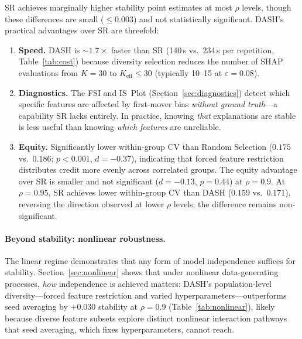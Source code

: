 \documentclass[11pt]{article}
\newcommand{\dash}{\textsc{DASH}}
\newcommand{\rhovar}{\rho}
\begin{document}
SR achieves marginally higher stability point estimates at most
$\rhovar$ levels, though these differences are small ($\leq 0.003$) and
not statistically significant.  \dash{}'s practical advantages over SR
are threefold:
\begin{enumerate}
  \item \textbf{Speed.} \dash{} is ${\sim}1.7\times$ faster than SR (140\,s
    vs.\ 234\,s per repetition, Table~\ref{tab:cost}) because diversity
    selection reduces the number of SHAP evaluations from $K = 30$ to
    $K_{\text{eff}} \leq 30$ (typically 10--15 at $\varepsilon = 0.08$).
  \item \textbf{Diagnostics.} The FSI and IS~Plot
    (Section~\ref{sec:diagnostics}) detect which specific features are
    affected by first-mover bias \emph{without ground truth}---a
    capability SR lacks entirely. In practice, knowing \emph{that}
    explanations are stable is less useful than knowing \emph{which
    features} are unreliable.
  \item \textbf{Equity.} Significantly lower within-group CV than
    Random Selection ($0.175$ vs.\ $0.186$; $p < 0.001$, $d = -0.37$),
    indicating that forced feature restriction distributes credit more
    evenly across correlated groups. The equity advantage over SR is
    smaller and not significant ($d = -0.13$, $p = 0.44$) at
    $\rhovar = 0.9$.  At $\rhovar = 0.95$, SR achieves lower
    within-group CV than \dash{} ($0.159$ vs.\ $0.171$), reversing the
    direction observed at lower $\rhovar$ levels; the difference remains
    non-significant.
\end{enumerate}

\paragraph{Beyond stability: nonlinear robustness.}
The linear regime demonstrates that any form of model independence
suffices for stability. Section~\ref{sec:nonlinear} shows that under
nonlinear data-generating processes, \emph{how} independence is achieved
matters: \dash{}'s population-level diversity---forced feature restriction
and varied hyperparameters---outperforms seed averaging by $+0.030$
stability at $\rhovar = 0.9$ (Table~\ref{tab:nonlinear}), likely because
diverse feature subsets explore distinct nonlinear interaction pathways
that seed averaging, which fixes hyperparameters, cannot reach.
\end{document}
